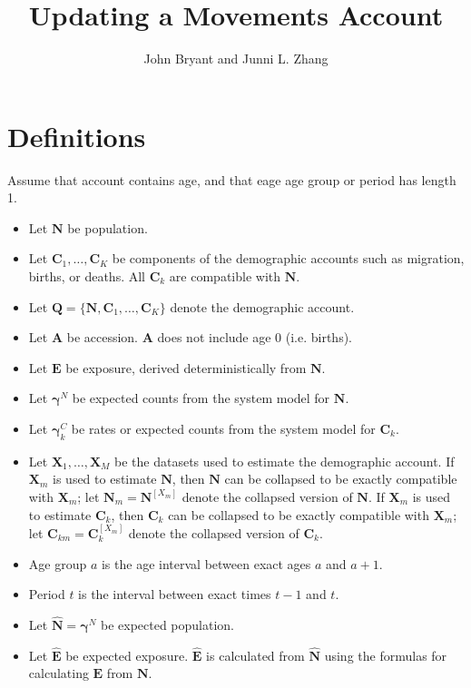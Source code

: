 \documentclass{article}
\title{Updating a Movements Account}
\author{John Bryant and Junni L. Zhang}
\begin{document}
\maketitle


\section{Definitions}

Assume that account contains age, and that eage age group or period has length 1.

\begin{itemize}
  \item Let $\bm{N}$ be population. 
  \item Let $\bm{C}_1, \dotsc, \bm{C}_K$ be components of the demographic accounts such as migration, births,  or deaths. All $\bm{C}_k$ are compatible with $\bm{N}$.
  \item Let $\bm{Q} = \{\bm{N}, \bm{C}_1, \dotsc, \bm{C}_K \}$ denote the demographic account.
  \item Let $\bm{A}$ be accession. $\bm{A}$ does not include age 0 (i.e. births).
  \item Let $\bm{E}$ be exposure, derived deterministically from $\bm{N}$.
  \item Let $\bm{\gamma}^N$ be expected counts from the system model for $\bm{N}$.
  \item Let $\bm{\gamma}_k^C$ be rates or expected counts from the system model for $\bm{C}_k$. 
  \item Let $\bm{X}_1, \dotsc, \bm{X}_M$ be the datasets used to estimate the demographic account.  If $\bm{X}_m$ is used to estimate $\bm{N}$, then $\bm{N}$ can be collapsed to be exactly compatible with $\bm{X}_m$; let  $\bm{N}_m = \bm{N}^{[X_m]}$ denote the collapsed version of $\bm{N}$.  If $\bm{X}_m$ is used to estimate $\bm{C}_k$, then $\bm{C}_k$ can be collapsed to be exactly compatible with $\bm{X}_m$; let  $\bm{C}_{km} = \bm{C}_k^{[X_m]}$ denote the collapsed version of $\bm{C}_k$.  
  \item Age group $a$ is the age interval between exact ages $a$ and $a+1$.
  \item Period $t$ is the interval between exact times $t-1$ and $t$.
  \item Let $\hat{\bm{N}} =\bm{\gamma}^N$ be expected population.
  \item Let $\hat{\bm{E}}$ be expected exposure.  $\hat{\bm{E}}$ is calculated from $\hat{\bm{N}}$ using the formulas for calculating $\bm{E}$ from $\bm{N}$.
\end{itemize}
\end{document}
